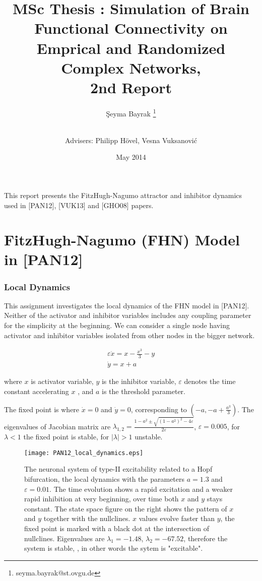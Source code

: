 \documentclass[12pt]{article}
\title{MSc Thesis : Simulation of Brain Functional Connectivity on Emprical and Randomized Complex Networks, \\ 2nd Report}
\author[1]{\c{S}eyma Bayrak \thanks{seyma.bayrak@st.ovgu.de}}
\author[ ]{\\ Advisers: Philipp H\"{o}vel, Vesna Vuksanovi\'c}
\affil[1]{\footnotesize{Integrative Neuroscience MSc, Otto von Guericke University, Magdeburg}}
\date{May 2014}
\begin{document}
   \maketitle
   
This report presents the FitzHugh-Nagumo attractor and inhibitor dynamics used in [PAN12], [VUK13] and [GHO08] papers. 

\section{FitzHugh-Nagumo (FHN) Model in [PAN12]} 

\subsubsection{Local Dynamics}

This assignment investigates the local dynamics of the FHN model in [PAN12]. Neither of the activator and inhibitor variables includes any coupling parameter for the simplicity at the beginning. We can consider a single node having activator and inhibitor variables isolated from other nodes in the bigger network. 
   
\begin{subequations} \begin{align} \varepsilon  \dot{x} = x - \frac{x^3}{3} -y   \label{eqn: frobenius 6}\\  \dot{y} = x+a \label{eqn: frobenius 7}   \end{align} 
\end{subequations}

where $x$ is activator variable, $y$ is the inhibitor variable, $\varepsilon$ denotes the time constant accelerating $x$ , and $a$ is the threshold parameter. 


The fixed point is where $\dot{x}=0$ and $\dot{y}=0$, corresponding 
to $( -a, -a+\frac{a^3}{3} )$. The eigenvalues of Jacobian matrix are 
 $\lambda_{1,2}=\frac{1-a^2\pm \sqrt{(1-a^2)^2-4\varepsilon}}{2\varepsilon}$, $\varepsilon=0.005$, for $\lambda<1$ the fixed point is stable, for $|\lambda|>1$ unstable.


\begin{figure}[h!]
	\centering
	\texttt{[image: PAN12\_local\_dynamics.eps]}
	\caption{The neuronal system of type-II excitability related to a Hopf bifurcation, the local dynamics with the parameters $a=1.3$ and $\varepsilon = 0.01$. The time evolution shows a rapid excitation and a weaker rapid inhibition at very beginning, over time both $x$ and $y$ stays constant. The state space figure on the right shows the pattern of $x$ and $y$ together with the nullclines. $x$ values evolve faster than $y$, the fixed point is marked with a black dot at the intersection of nullclines. Eigenvalues are $\lambda_1=-1.48$, $\lambda_2 = -67.52$, therefore the system is stable, , in other words the sytem is "excitable". }
\end{figure}
\end{document}
